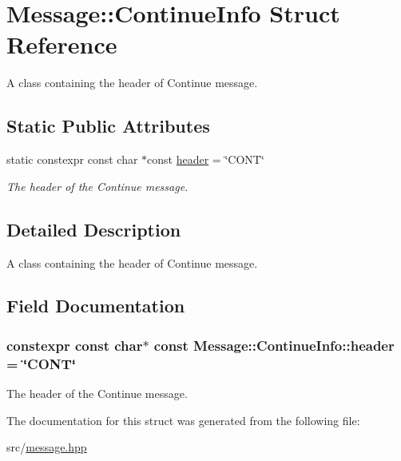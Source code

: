 \hypertarget{struct_message_1_1_continue_info}{}\section{Message\+:\+:Continue\+Info Struct Reference}
\label{struct_message_1_1_continue_info}


A class containing the header of Continue message.  


\subsection*{Static Public Attributes}
\begin{DoxyCompactItemize}
\item 
static constexpr const char $\ast$const \hyperlink{struct_message_1_1_continue_info_ae80c96209d5d458d4abdf847e53f3437}{header} = \char`\"{}C\+O\+NT\char`\"{}
\begin{DoxyCompactList}\small\item\em The header of the Continue message. \end{DoxyCompactList}\end{DoxyCompactItemize}


\subsection{Detailed Description}
A class containing the header of Continue message. 

\subsection{Field Documentation}
\subsubsection[{\texorpdfstring{header}{header}}]{\setlength{\rightskip}{0pt plus 5cm}constexpr const char$\ast$ const Message\+::\+Continue\+Info\+::header = \char`\"{}C\+O\+NT\char`\"{}\hspace{0.3cm}{\ttfamily [static]}}\hypertarget{struct_message_1_1_continue_info_ae80c96209d5d458d4abdf847e53f3437}{}\label{struct_message_1_1_continue_info_ae80c96209d5d458d4abdf847e53f3437}


The header of the Continue message. 



The documentation for this struct was generated from the following file\+:\begin{DoxyCompactItemize}
\item 
src/\hyperlink{message_8hpp}{message.\+hpp}\end{DoxyCompactItemize}
